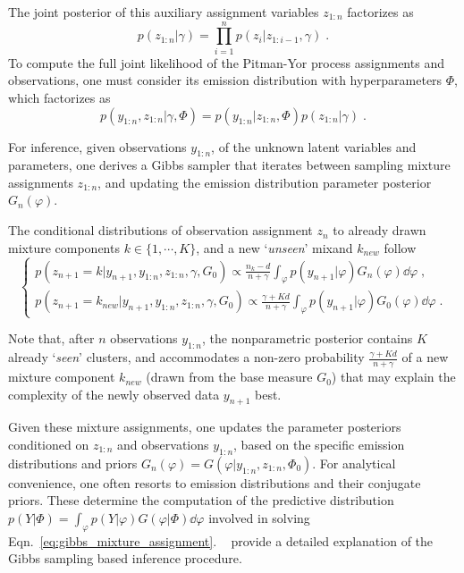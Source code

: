 The joint posterior of this auxiliary assignment variables $z_{1:n}$ factorizes as
\begin{equation}
p(z_{1:n}|\gamma) = \prod_{i=1}^n p(z_i|z_{1:i-1},\gamma) \; .
\end{equation}
To compute the full joint likelihood of the Pitman-Yor process assignments and observations, one must consider its emission distribution with hyperparameters $\varPhi$, which factorizes as
\begin{equation}
p(y_{1:n},z_{1:n}|\gamma, \varPhi) = p(y_{1:n}|z_{1:n}, \varPhi) p(z_{1:n}|\gamma) \; .
\end{equation}

For inference, given observations $y_{1:n}$, of the unknown latent variables and parameters, one derives a Gibbs sampler that iterates between sampling mixture assignments $z_{1:n}$, and updating the emission distribution parameter posterior $G_n(\varphi)$.

The conditional distributions of observation assignment $z_n$ to already drawn mixture components $k\in\{1, \cdots, K\}$, and a new `\textit{unseen}' mixand $k_{new}$ follow
\begin{equation}
\begin{cases}
p(z_{n+1}=k|y_{n+1},y_{1:n},z_{1:n}, \gamma, G_0) \propto \frac{n_k-d}{n+\gamma} \int_{\varphi} p(y_{n+1}|\varphi) G_n(\varphi) \dd{\varphi}\; ,\\
p(z_{n+1}=k_{new}|y_{n+1},y_{1:n},z_{1:n}, \gamma, G_0) \propto \frac{\gamma+K d}{n+\gamma} \int_{\varphi} p(y_{n+1}|\varphi) G_0(\varphi) \dd{\varphi} \; .
\end{cases}
\label{eq:gibbs_mixture_assignment}
\end{equation}

Note that, after $n$ observations $y_{1:n}$, the nonparametric posterior contains $K$ already `\textit{seen}' clusters, and accommodates a non-zero probability $\frac{\gamma+Kd}{n+\gamma}$ of a new mixture component $k_{new}$ (drawn from the base measure $G_0$) that may explain the complexity of the newly observed data $y_{n+1}$ best.

Given these mixture assignments, one updates the parameter posteriors conditioned on $z_{1:n}$ and observations $y_{1:n}$, based on the specific emission distributions and priors $G_n(\varphi)=G(\varphi|y_{1:n}, z_{1:n},\varPhi_0)$.
For analytical convenience, one often resorts to emission distributions and their conjugate priors.
These determine the computation of the predictive distribution $p(Y|\varPhi)= \int_{\varphi} p(Y|\varphi) G(\varphi|\varPhi) \dd{\varphi}$ involved in solving Eqn.~\eqref{eq:gibbs_mixture_assignment}.
~\citep{j-Teh2010} provide a detailed explanation of the Gibbs sampling based inference procedure.